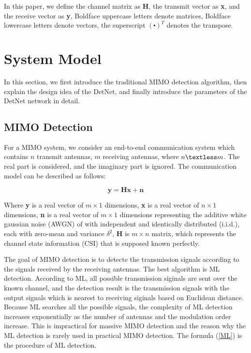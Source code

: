 \documentclass[conference]{IEEEtran}
\begin{document}
In this paper, we define the channel matrix as \textbf{H}, the transmit vector as \textbf{x}, and the receive vector as \textbf{y}, Boldface uppercase letters denote matrices, Boldface lowercase letters denote vectors, the superscript ${(\centerdot)^T}$ denotes the transpose.


\section{System Model}
In this section, we first introduce the traditional MIMO detection algorithm, then explain the design idea of the DetNet, and finally introduce the parameters of the DetNet network in detail.

\subsection{MIMO Detection}

For a MIMO system, we consider an end-to-end communication system which contains ${n}$ transmit antennas, ${m}$ receiving antennas, where ${n \textless m}$. The real part is considered, and the imaginary part is ignored. The communication model can be described as follows:

\begin{equation}
\label{basic model}
\textbf{y}=\textbf{Hx}+\textbf{n}
\end{equation}

Where \textbf{y} is a real vector of ${m \times 1}$ dimensions, \textbf{x} is a real vector of ${n \times 1}$ dimensions, \textbf{n} is a real vector of ${m \times 1}$ dimensions representing the additive white gaussian noise (AWGN) of with independent and identically distributed (i.i.d.), each with zero-mean and variance ${{\delta}^2}$, \textbf{H} is ${m \times n}$ matrix, which represents the channel state information (CSI) that is supposed known perfectly.

The goal of MIMO detection is to detecte the transmission signals according to the signals received by the receiving antennas. The best algorithm is ML detection. According to ML, all possible transmission siginals are sent over the known channel, and the detection result is the transmission signals with the output signals which is nearest to receiving siginals based on Euclidean distance. Because ML searches all the possible signals, the complexity of ML detection increases exponentially as the number of antennas and the modulation order increase. This is impractical for massive MIMO detection and the reason why the ML detection is rarely used in practical MIMO detection. The formula (\ref{ML}) is the procedure of ML detection.
\end{document}
